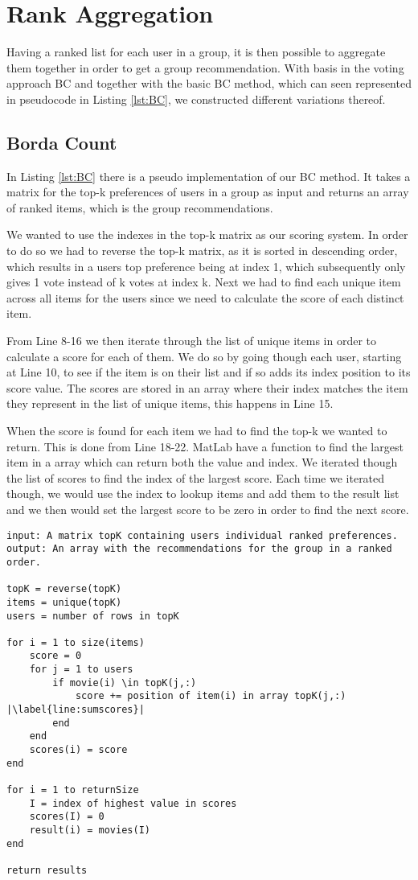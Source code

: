 \section{Rank Aggregation}\label{sec:rank_aggregation}
Having a ranked list for each user in a group, it is then possible to aggregate them together in order to get a group recommendation. With basis in the voting approach BC and together with the basic BC method, which can seen represented in pseudocode in Listing \ref{lst:BC}, we constructed different variations thereof. 
\subsection{Borda Count}
In Listing \ref{lst:BC} there is a pseudo implementation of our BC method. It takes a matrix for the top-k preferences of users in a group as input and returns an array of ranked items, which is the group recommendations. 

We wanted to use the indexes in the top-k matrix as our scoring system. In order to do so we had to reverse the top-k matrix, as it is sorted in descending order, which results in a users top preference being at index 1, which subsequently only gives 1 vote instead of k votes at index k. Next we had to find each unique item across all items for the users since we need to calculate the score of each distinct item.

From Line 8-16 we then iterate through the list of unique items in order to calculate a score for each of them. We do so by going though each user, starting at Line 10, to see if the item is on their list and if so adds its index position to its score value. The scores are stored in an array where their index matches the item they represent in the list of unique items, this happens in Line 15.

When the score is found for each item we had to find the top-k we wanted to return. This is done from Line 18-22. MatLab have a function to find the largest item in a array which can return both the value and index. We iterated though the list of scores to find the index of the largest score. Each time we iterated though, we would use the index to lookup items and add them to the result list and we then would set the largest score to be zero in order to find the next score. 
\begin{lstlisting}[caption={Borda Count implementation},label=lst:BC,escapechar=|]
input: A matrix topK containing users individual ranked preferences.
output: An array with the recommendations for the group in a ranked order.

topK = reverse(topK)
items = unique(topK)
users = number of rows in topK

for i = 1 to size(items)
	score = 0
	for j = 1 to users
		if movie(i) \in topK(j,:)
			score += position of item(i) in array topK(j,:) |\label{line:sumscores}|
		end
	end
	scores(i) = score
end

for i = 1 to returnSize
	I = index of highest value in scores
	scores(I) = 0
	result(i) = movies(I)
end

return results

\end{lstlisting}

